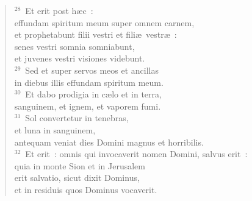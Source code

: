 \begin{verse}${}^{28}$~Et erit post h\ae c~:\\ effundam spiritum meum super omnem carnem,\\ et prophetabunt filii vestri et fili\ae\ vestr\ae~:\\ senes vestri somnia somniabunt,\\ et juvenes vestri visiones videbunt.\\
${}^{29}$~Sed et super servos meos et ancillas\\ in diebus illis effundam spiritum meum.\\
${}^{30}$~Et dabo prodigia in c\ae lo et in terra,\\ sanguinem, et ignem, et vaporem fumi.\\
${}^{31}$~Sol convertetur in tenebras,\\ et luna in sanguinem,\\ antequam veniat dies Domini magnus et horribilis.\\
${}^{32}$~Et erit~: omnis qui invocaverit nomen Domini, salvus erit~:\\ quia in monte Sion et in Jerusalem\\ erit salvatio, sicut dixit Dominus,\\ et in residuis quos Dominus vocaverit.\end{verse}



